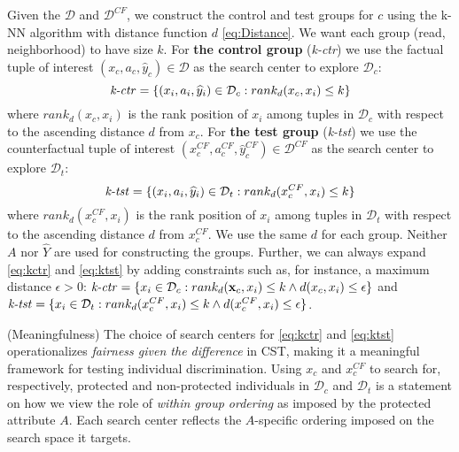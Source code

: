 Given the $\mathcal{D}$ and $\mathcal{D}^{CF}$, we construct the control and test groups for $c$ using the k-NN algorithm with distance function $d$ \eqref{eq:Distance}.
We want each group (read, neighborhood) to have size $k$. 
%
For \textbf{the control group} (\textit{k-ctr}) we use the factual tuple of interest $(x_c, a_c, \hat{y}_c) \in \mathcal{D}$ as the search center to explore $\mathcal{D}_c$:
%
\begin{equation}
\label{eq:kctr}
    \text{\textit{k-ctr}} =
    \{ (x_i, a_i, \widehat{y}_i) \in \mathcal{D}_c: rank_{d}( x_c, x_i) \leq k \}
\end{equation}
%
where $rank_{d}(x_c, x_i)$ is the rank position of $x_i$ among tuples in $\mathcal{D}_c$ with respect to the ascending distance $d$ from $x_c$. 
%
For \textbf{the test group} (\textit{k-tst}) we use the counterfactual tuple of interest $(x^{CF}_c, a^{CF}_c, \widehat{y}^{CF}_c) \in \mathcal{D}^{CF}$ as the search center to explore $\mathcal{D}_t$:
%
\begin{equation}
\label{eq:ktst}
    \text{\textit{k-tst}} = \{ (x_i, a_i, \widehat{y}_i) \in \mathcal{D}_t: rank_{d}( x^{CF}_c, x_i) \leq k \}
\end{equation}
%
where $rank_{d}(x_c^{CF}, x_i)$ is the rank position of $x_i$ among tuples in $\mathcal{D}_t$ with respect to the ascending distance $d$ from $x_c^{CF}$. 
%
We use the same $d$ for each group. 
Neither $A$ nor $\hat{Y}$ are used for constructing the groups.
Further, we can always expand \eqref{eq:kctr} and \eqref{eq:ktst} by adding constraints such as, for instance, a maximum distance $\epsilon > 0$: $\text{\textit{k-ctr}} = \{ x_i \in \mathcal{D}_c: rank_{d}( \mathbf{x}_c, x_i) \leq k \land d(x_c, x_i) \leq \epsilon \}$ and $\text{\textit{k-tst}} = \{ x_i \in \mathcal{D}_t: rank_{d}( x_c^{CF}, x_i) \leq k \land d(x_c^{CF}, x_i) \leq \epsilon \}$.

%
\begin{remark}(Meaningfulness)
\label{rem:meaningfulness}
    The choice of search centers for \eqref{eq:kctr} and \eqref{eq:ktst} operationalizes \textit{fairness given the difference} in CST, making it a meaningful framework for testing individual discrimination.
    Using $x_c$ and $x_c^{CF}$ to search for, respectively, protected and non-protected individuals in $\mathcal{D}_c$ and $\mathcal{D}_t$ is a statement on how we view the role of \textit{within group ordering} as imposed by the protected attribute $A$.
    Each search center reflects the $A$-specific ordering imposed on the search space it targets.
\end{remark}
%

